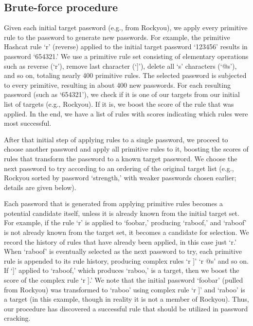 \documentclass[letterpaper,twocolumn,10pt]{article}
\begin{document}
\subsection{Brute-force procedure}

Given each initial target password (e.g., from Rockyou), we apply every
primitive rule to the password to generate new passwords. For example, the
primitive Hashcat rule `r' (reverse) applied to the initial target password
`123456' results in password `654321.' We use a primitive rule set consisting of
elementary operations such as reverse (`r'), remove last character (`]'), delete
all `s' characters (`@s'), and so on, totaling nearly 400 primitive rules. The
selected password is subjected to every primitive, resulting in about 400 new
passwords. For each resulting password (such as `654321'), we check if it is one
of our targets from our initial list of targets (e.g., Rockyou). If it is, we
boost the score of the rule that was applied. In the end, we have a list of
rules with scores indicating which rules were most successful.

After that initial step of applying rules to a single password, we proceed to
choose another password and apply all primitive rules to it, boosting the scores
of rules that transform the password to a known target password. We choose the
next password to try according to an ordering of the original target list (e.g.,
Rockyou sorted by password `strength,' with weaker passwords chosen earlier;
details are given below).

Each password that is generated from applying primitive rules becomes a
potential candidate itself, unless it is already known from the initial target
set. For example, if the rule `r' is applied to `foobar,' producing `raboof,'
and `raboof' is not already known from the target set, it becomes a candidate
for selection. We record the history of rules that have already been applied, in
this case just `r.' When `raboof' is eventually selected as the next password to
try, each primitive rule is appended to its rule history, producing complex
rules `r ]' `r @s' and so on. If `]' applied to `raboof,' which produces
`raboo,' is a target, then we boost the score of the complex rule `r ].' We note
that the initial password `foobar' (pulled from Rockyou) was transformed to
`raboo' using complex rule `r ]' and `raboo' is a target (in this example,
though in reality it is not a member of Rockyou). Thus, our procedure has
discovered a successful rule that should be utilized in password cracking.
\end{document}
